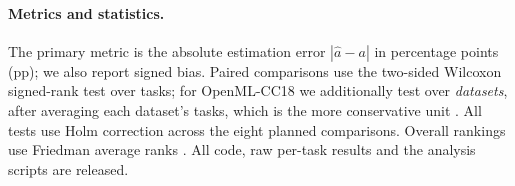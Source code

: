 \paragraph{Metrics and statistics.}
The primary metric is the absolute estimation error $|\hat a-a|$ in percentage points (pp); we also report signed bias. Paired comparisons use the two-sided Wilcoxon signed-rank test over tasks; for OpenML-CC18 we additionally test over \emph{datasets}, after averaging each dataset's tasks, which is the more conservative unit \citep{demsar2006}. All tests use Holm correction across the eight planned comparisons. Overall rankings use Friedman average ranks \citep{demsar2006}. All code, raw per-task results and the analysis scripts are released.
